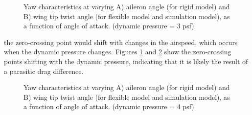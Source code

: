 \documentclass[11pt]{ucthesis}
\begin{document}
\begin{figure}[thpb]
\hfill
{}
\hfill
{}
\hfill
\caption{Yaw characteristics at varying A) aileron angle (for rigid model) and B) wing tip twist angle (for flexible model and simulation model), as a function of angle of attack. (dynamic pressure = 3 psf)}
\label{fig:Q3Yaw}
\end{figure}

the zero-crossing point would shift with changes in the airspeed, which occurs when the dynamic pressure changes. Figures \ref{fig:Q3Yaw} and \ref{fig:Q4Yaw} show the zero-crossing points shifting with the dynamic pressure, indicating that it is likely the result of a parasitic drag difference.

\begin{figure}[thpb]
\hfill
{}
\hfill
{}
\hfill
\caption{Yaw characteristics at varying A) aileron angle (for rigid model) and B) wing tip twist angle (for flexible model and simulation model), as a function of angle of attack. (dynamic pressure = 4 psf)}
\label{fig:Q4Yaw}
\end{figure}
\end{document}
